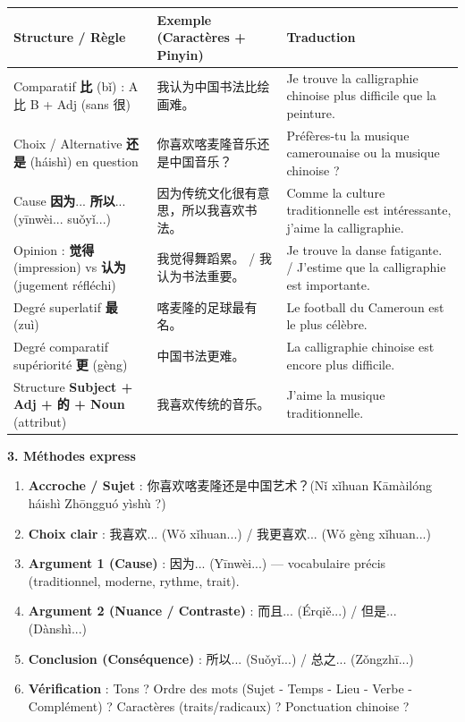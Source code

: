 \documentclass[11pt]{article}
\begin{document}
\begin{bilan}
\begin{center}
\begin{tabularx}{\linewidth}{|X|X|X|}
\hline
\rowcolor{popblueL} \textbf{Structure / Règle} & \textbf{Exemple (Caractères + Pinyin)} & \textbf{Traduction} \\
\hline
Comparatif \textbf{比} (bǐ) : A 比 B + Adj (sans 很) & 我认为中国书法比绘画难。 & Je trouve la calligraphie chinoise plus difficile que la peinture. \\
\hline
Choix / Alternative \textbf{还是} (háishì) en question & 你喜欢喀麦隆音乐还是中国音乐？ & Préfères-tu la musique camerounaise ou la musique chinoise ? \\
\hline
Cause \textbf{因为}... \textbf{所以}... (yīnwèi... suǒyǐ...) & 因为传统文化很有意思，所以我喜欢书法。 & Comme la culture traditionnelle est intéressante, j'aime la calligraphie. \\
\hline
Opinion : \textbf{觉得} (impression) vs \textbf{认为} (jugement réfléchi) & 我觉得舞蹈累。 / 我认为书法重要。 & Je trouve la danse fatigante. / J'estime que la calligraphie est importante. \\
\hline
Degré superlatif \textbf{最} (zuì) & 喀麦隆的足球最有名。 & Le football du Cameroun est le plus célèbre. \\
\hline
Degré comparatif supériorité \textbf{更} (gèng) & 中国书法更难。 & La calligraphie chinoise est encore plus difficile. \\
\hline
Structure \textbf{Subject + Adj + 的 + Noun} (attribut) & 我喜欢传统的音乐。 & J'aime la musique traditionnelle. \\
\hline
\end{tabularx}
\end{center}

\textbf{3. Méthodes express}

\end{bilan}

\begin{methode}
\begin{enumerate}
\item \textbf{Accroche / Sujet} : 你喜欢喀麦隆还是中国艺术？(Nǐ xǐhuan Kāmàilóng háishì Zhōngguó yìshù ?)
\item \textbf{Choix clair} : 我喜欢... (Wǒ xǐhuan...) / 我更喜欢... (Wǒ gèng xǐhuan...)
\item \textbf{Argument 1 (Cause)} : 因为... (Yīnwèi...) — vocabulaire précis (traditionnel, moderne, rythme, trait).
\item \textbf{Argument 2 (Nuance / Contraste)} : 而且... (Érqiě...) / 但是... (Dànshì...)
\item \textbf{Conclusion (Conséquence)} : 所以... (Suǒyǐ...) / 总之... (Zǒngzhī...)
\item \textbf{Vérification} : Tons ? Ordre des mots (Sujet - Temps - Lieu - Verbe - Complément) ? Caractères (traits/radicaux) ? Ponctuation chinoise ?
\end{enumerate}
\end{methode}
\end{document}
